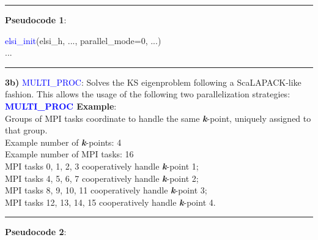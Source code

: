 \documentclass{report}
\begin{document}
\noindent\rule{18cm}{0.4pt}

\textbf{Pseudocode 1}:\\

\begin{algorithm}[H]
\textcolor{blue}{elsi\_init}(elsi\_h, ..., parallel\_mode=0, ...)\\
...
\hspace{0.3cm}\\
\end{algorithm}

\noindent\rule{18cm}{0.4pt}

\bigskip
\textbf{3b)} \textcolor{blue}{MULTI\_PROC}:  Solves the KS eigenproblem following a ScaLAPACK-like fashion.  This allows the usage of the following two parallelization strategies:\\

\textbf{\textcolor{blue}{MULTI\_PROC} Example}:\\

Groups of MPI tasks coordinate to handle the same \textbf{\textit{k}}-point, uniquely assigned to that group.\\

Example number of \textbf{\textit{k}}-points:  4\\
Example number of MPI tasks:  16\\

MPI tasks  0,  1,  2,  3 cooperatively handle \textbf{\textit{k}}-point 1;\\
MPI tasks  4,  5,  6,  7 cooperatively handle \textbf{\textit{k}}-point 2;\\
MPI tasks  8,  9, 10, 11 cooperatively handle \textbf{\textit{k}}-point 3;\\
MPI tasks 12, 13, 14, 15 cooperatively handle \textbf{\textit{k}}-point 4.\\

\newpage
\noindent\rule{18cm}{0.4pt}

\textbf{Pseudocode 2}:\\
\end{document}
